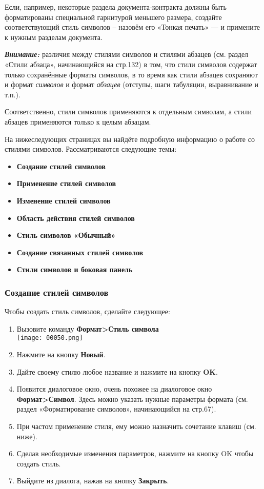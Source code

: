 \documentclass[a4paper,10pt]{article}
\begin{document}
Если, например, некоторые раздела документа-контракта должны быть форматированы специальной гарнитурой меньшего размера, создайте соответствующий стиль символов -- назовём его «Тонкая печать» --- и примените к нужным разделам документа.

\textbf{\textit{Внимание:}} различия между стилями символов и стилями абзацев (см. раздел «Стили абзаца», начинающийся на стр.132) в том, что стили символов содержат только сохранённые форматы символов, в то время как стили абзацев сохраняют и формат \textit{символов} и формат \textit{абзацев} (отступы, шаги табуляции, выравнивание и т.п.).

Соответственно, стили символов применяются к отдельным символам, а стили абзацев применяются только к целым абзацам.

На нижеследующих страницах вы найдёте подробную информацию о работе со стилями символов. Рассматриваются следующие темы:
\begin{itemize}
 \item \textbf{Создание стилей символов}
 \item \textbf{Применение стилей символов}
 \item \textbf{Изменение стилей символов}
 \item \textbf{Область действия стилей символов}
 \item \textbf{Стиль символов «Обычный»}
 \item \textbf{Создание связанных стилей символов}
 \item \textbf{Стили символов и боковая панель}
\end{itemize}

\subsubsection{Создание стилей символов}
Чтобы создать стиль символов, сделайте следующее:
\begin{enumerate}
 \item Вызовите команду \textbf{Формат>Стиль символа}\\
 \texttt{[image: 00050.png]}
 \item Нажмите на кнопку \textbf{Новый}.
 \item Дайте своему стилю любое название и нажмите на кнопку \textbf{OK}.
 \item Появится диалоговое окно, очень похожее на диалоговое окно \textbf{Формат>Символ}. Здесь можно указать нужные параметры формата (см. раздел «Форматирование символов», начинающийся на стр.67).
 \item При частом применение стиля, ему можно назначить сочетание клавиш (см. ниже).
 \item Сделав необходимые изменения параметров, нажмите на кнопку OK чтобы создать стиль.
 \item Выйдите из диалога, нажав на кнопку \textbf{Закрыть}.
\end{enumerate}
\end{document}
